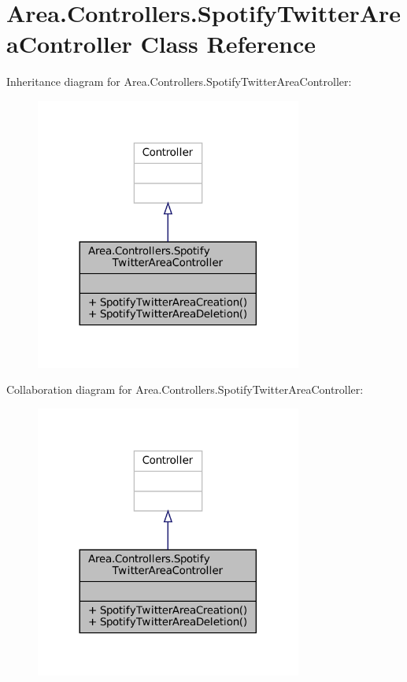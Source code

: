 \hypertarget{classArea_1_1Controllers_1_1SpotifyTwitterAreaController}{}\section{Area.\+Controllers.\+Spotify\+Twitter\+Area\+Controller Class Reference}
\label{classArea_1_1Controllers_1_1SpotifyTwitterAreaController}


Inheritance diagram for Area.\+Controllers.\+Spotify\+Twitter\+Area\+Controller\+:
\nopagebreak
\begin{figure}[H]
\begin{center}
\leavevmode
\includegraphics[width=248pt]{classArea_1_1Controllers_1_1SpotifyTwitterAreaController__inherit__graph}
\end{center}
\end{figure}


Collaboration diagram for Area.\+Controllers.\+Spotify\+Twitter\+Area\+Controller\+:
\nopagebreak
\begin{figure}[H]
\begin{center}
\leavevmode
\includegraphics[width=248pt]{classArea_1_1Controllers_1_1SpotifyTwitterAreaController__coll__graph}
\end{center}
\end{figure}
